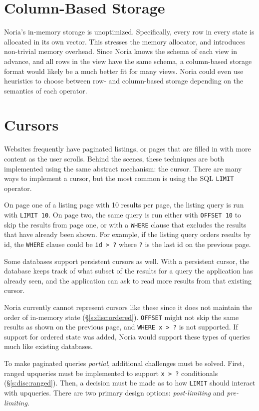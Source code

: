 \section{Column-Based Storage}

Noria's in-memory storage is unoptimized. Specifically, every row in every state
is allocated in its own vector. This stresses the memory allocator, and
introduces non-trivial memory overhead. Since Noria knows the schema of each
view in advance, and all rows in the view have the same schema, a column-based
storage format would likely be a much better fit for many views. Noria could
even use heuristics to choose between row- and column-based storage depending on
the semantics of each operator.

\section{Cursors}

Websites frequently have paginated listings, or pages that are filled in with
more content as the user scrolls. Behind the scenes, these techniques are both
implemented using the same abstract mechanism: the cursor. There are many ways to
implement a cursor, but the most common is using the SQL \texttt{LIMIT}
operator.

On page one of a listing page with 10 results per page, the listing query is run
with \texttt{LIMIT 10}. On page two, the same query is run either with
\texttt{OFFSET 10} to skip the results from page one, or with a \texttt{WHERE}
clause that excludes the results that have already been shown. For example, if
the listing query orders results by id, the \texttt{WHERE} clause could be
\texttt{id > ?} where \texttt{?} is the last id on the previous page.

Some databases support persistent cursors as well. With a persistent cursor, the
database keeps track of what subset of the results for a query the application
has already seen, and the application can ask to read more results from that
existing cursor.

Noria currently cannot represent cursors like these since it does not maintain
the order of in-memory state (\S\ref{s:disc:ordered}). \texttt{OFFSET} might not
skip the same results as shown on the previous page, and \texttt{WHERE x > ?} is
not supported. If support for ordered state was added, Noria would support these
types of queries much like existing databases.

To make paginated queries \emph{partial}, additional challenges must be solved.
First, ranged upqueries must be implemented to support \texttt{x > ?}
conditionals (\S\ref{s:disc:ranged}). Then, a decision must be made as to how
\texttt{LIMIT} should interact with upqueries. There are two primary design
options: \emph{post-limiting} and \emph{pre-limiting}.

